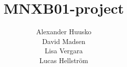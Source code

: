 \documentclass{article}
\begin{document}
\title{MNXB01-project}
\author{Alexander Huusko \\
		David Madsen \\
		Lisa Vergara \\
		Lucas Hellström}
\date{ }
 
 
\maketitle
\thispagestyle{empty}
\clearpage

\tableofcontents
\thispagestyle{empty}
\clearpage






 

 





\end{document}
